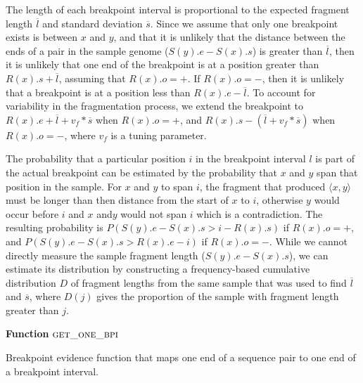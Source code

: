 \documentclass[11pt]{article}
\begin{document}
The length of each breakpoint interval is proportional to the expected fragment
length $\overline{l}$ and standard deviation $\overline{s}$.  Since we assume
that only one breakpoint exists is between $x$ and $y$, and that it is unlikely
that the distance between the ends of a pair in the sample genome ($S(y).e -
S(x).s$) is greater than $\overline{l}$, then it is unlikely that one end of the
breakpoint is at a position greater than $R(x).s + \overline{l}$, assuming that
$R(x).o=+$. If $R(x).o=-$, then it is unlikely that a breakpoint is at a
position less than $R(x).e - \overline{l}$.  To account for variability in the
fragmentation process, we extend the breakpoint to 
$R(x).e + \overline{l} + v_f*\overline{s}$ when $R(x).o=+$, and 
$R(x).s - (\overline{l} + v_f*\overline{s})$ when $R(x).o=-$, 
where $v_f$ is a tuning parameter.  

The probability that a particular position $i$ in the breakpoint interval $l$ is
part of the actual breakpoint can be estimated by the probability that $x$ and
$y$ span that position in the sample. For $x$ and $y$ to span $i$, the fragment
that produced $\langle x,y \rangle$ must be longer than then distance from the
start of $x$ to $i$, otherwise $y$ would occur before $i$ and $x$ and$y$ would
not span $i$ which is a contradiction.  The resulting probability is 
$P(S(y).e - S(x).s > i - R(x).s)$ if $R(x).o=+$, and 
$P(S(y).e - S(x).s > R(x).e - i)$ if $R(x).o=-$.
While we cannot directly measure the sample fragment length ($S(y).e - S(x).s$),
we can estimate its distribution by constructing a frequency-based cumulative
distribution $D$ of fragment lengths from the same sample that was used to find
$\overline{l}$ and $\overline{s}$, where $D(j)$ gives the proportion of the
sample with fragment length greater than $j$.

\begin{algorithm}[H]
    \DontPrintSemicolon
    \footnotesize
    \BlankLine
    \textbf{Function} $\textsc{get\_one\_bpi}$\;
	\caption{Breakpoint evidence function that maps one end of a sequence pair
			to one end of a breakpoint interval.}
    \label{get_one_bpi}
\end{algorithm}
\end{document}
